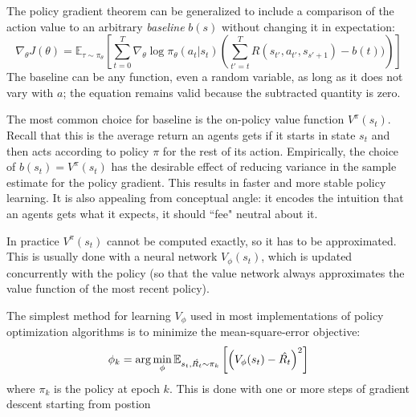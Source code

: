The policy gradient theorem can be generalized to include a comparison of the action value to an arbitrary \textit{baseline} $b(s)$ without changing it in expectation:
$$
    \nabla_{\theta} J(\theta) = \mathbb{E}_{\tau \sim \pi_\theta} \left[\sum_{t=0}^{T} \nabla_{\theta} \log \pi_{\theta}(a_t|s_t) \left ( 
    \sum_{t'=t}^{T} R(s_{t'}, a_{t'}, s_{s' + 1}) - b(t))
    \right ) \right]
$$
The baseline can be any function, even a random variable, as long as it does not vary with $a$; the equation remains valid because the subtracted quantity is zero.

The most common choice for baseline is the on-policy value function $V^{\pi}(s_t)$. Recall that this is the average return an agents gets if it starts in state $s_t$ and then acts according to policy $\pi$ for the rest of its action. 
Empirically, the choice of $b(s_t) = V^{\pi}(s_t)$ has the desirable effect of reducing variance in the sample estimate for the policy gradient. This results in faster and more stable policy learning. It is also appealing from conceptual angle: it encodes the intuition that an agents gets what it expects, it should ``fee" neutral about it. 

In practice $V^{\pi}(s_t)$ cannot be computed exactly, so it has to be approximated. This is usually done with a neural network $V_{\phi}(s_t)$, which is updated concurrently with the policy (so that the value network always approximates the value function of the most recent policy).

The simplest method for learning $V_{\phi}$ used in most implementations of policy optimization algorithms is to minimize the mean-square-error objective:
$$
\phi_k = \arg \min_{\phi} \mathbb E_{s_t, \hat{R_{t}} \sim \pi_{k}} \left [ \left(V_{\phi}(s_t) - \hat{R_t}  \right)^2 \right] 
$$
where $\pi_{k}$ is the policy at epoch $k$. This is done with one or more steps of gradient descent starting from postion 

